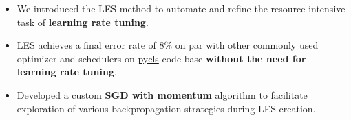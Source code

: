 \documentclass[10pt,a4paper,ragged2e,withhyper]{altacv}
\begin{document}
\begin{paracol}{2}
\switchcolumn{}

\begin{itemize}

    \item We introduced the LES method to automate and refine the resource-intensive task of \textbf{learning rate tuning}.
    
    \item LES achieves a final error rate of 8\% on par with other commonly used
        optimizer and schedulers on \href{https://github.com/facebookresearch/pycls}{pycls} code base
        \textbf{without the need for learning rate tuning}. 
    
    \item Developed a custom \textbf{SGD with momentum} algorithm to facilitate exploration of various backpropagation strategies during LES creation.
    
    
\end{itemize}
    
    
    





\end{paracol}
\end{document}

